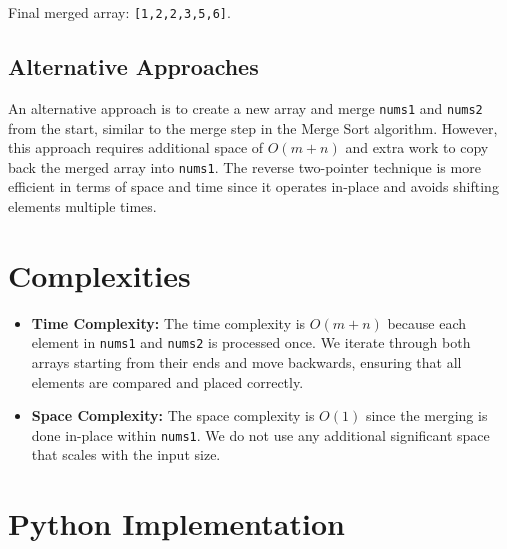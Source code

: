 Final merged array: \texttt{[1,2,2,3,5,6]}.

\subsection*{Alternative Approaches}

An alternative approach is to create a new array and merge \texttt{nums1} and \texttt{nums2} from the start, similar to the merge step in the Merge Sort algorithm. However, this approach requires additional space of $O(m + n)$ and extra work to copy back the merged array into \texttt{nums1}. The reverse two-pointer technique is more efficient in terms of space and time since it operates in-place and avoids shifting elements multiple times.

\section*{Complexities}

\begin{itemize}
    \item \textbf{Time Complexity:} The time complexity is $O(m + n)$ because each element in \texttt{nums1} and \texttt{nums2} is processed once. We iterate through both arrays starting from their ends and move backwards, ensuring that all elements are compared and placed correctly.
    \item \textbf{Space Complexity:} The space complexity is $O(1)$ since the merging is done in-place within \texttt{nums1}. We do not use any additional significant space that scales with the input size.
\end{itemize}

\section*{Python Implementation}

